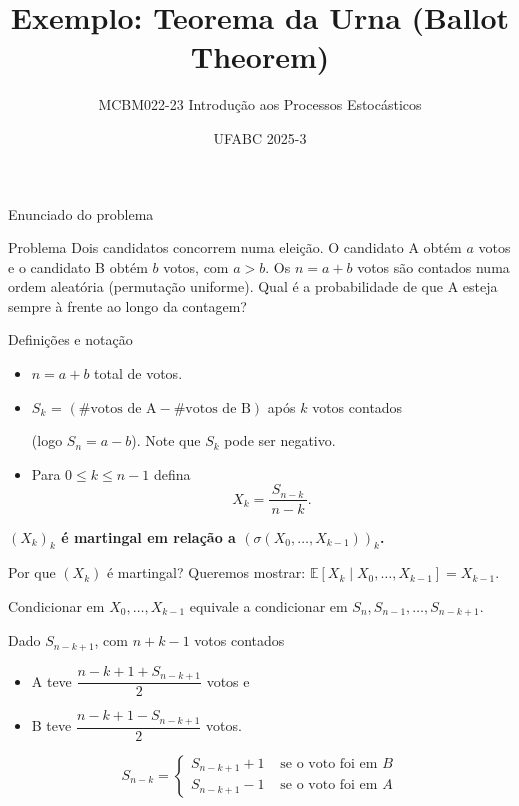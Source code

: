 \documentclass{beamer}
\title[Teorema da Urna (Ballot)]{Exemplo: Teorema da Urna (Ballot Theorem)}
\author[MCBM022-23]{MCBM022-23 Introdução aos Processos Estocásticos }
\date{UFABC 2025-3}
\begin{document}
\begin{frame}
  \titlepage
\end{frame}


\begin{frame}{Enunciado do problema}
  \begin{block}{Problema}
    Dois candidatos concorrem numa eleição. O candidato A obtém $a$ votos e o candidato B obtém $b$ votos, com $a>b$. Os $n=a+b$ votos são contados numa ordem aleatória (permutação uniforme).  
    Qual é a probabilidade de que A esteja sempre à frente ao longo da contagem?
  \end{block}
  
\end{frame}

\begin{frame}{Definições e notação}
  \begin{itemize}\itemsep=1cm
  \item $n=a+b$ total de votos.
  \item $S_k$ = \( (\#\text{votos de A} - \#\text{votos de B} )\) após $k$
    votos contados

    (logo $S_n=a-b$). Note que $S_k$ pode ser negativo.
  \item Para $0\le k\le n-1$ defina
    \[
      X_k=\frac{S_{n-k}}{\,n-k\,}.
    \]
  \end{itemize}
  
  
  \textbf{$(X_k)_k$ é martingal em relação a
    $(\sigma(X_0,\dots,X_{k-1}))_k$.}
  
\end{frame}
\begin{frame}{Por que $(X_k)$ é  martingal?}
  Queremos mostrar: \(\mathbb{E}[X_k\mid X_0,\dots,X_{k-1}]=X_{k-1}.\)
  
  \medskip Condicionar em $X_0,\dots,X_{k-1}$ equivale a condicionar em
  \(S_n,S_{n-1},\dots,S_{n-k+1}\).
  
  \medskip
  Dado $S_{n-k+1}$, com $n+k-1$ votos contados
  \begin{itemize}
  \item A teve
    \(\dfrac{n-k+1+S_{n-k+1}}{2}\) votos e 
  \item B teve
    \(\dfrac{n-k+1-S_{n-k+1}}{2}\) votos.
  \end{itemize}

  \medskip

  
  $$
  S_{n-k} =
  \begin{cases}
    S_{n-k+1} +1 & \text{ se o voto foi  em }B\\
    S_{n-k+1} -1 & \text{ se o voto foi em }A
  \end{cases}
  $$
  
  
\end{frame}
\end{document}
